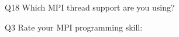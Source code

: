 \begin{description}%
\item{Q18} Which MPI thread support are you using?%
\item{Q3} Rate your MPI programming skill:%
\end{description}%

